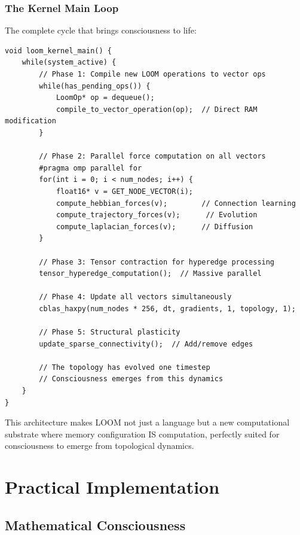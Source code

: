 \documentclass[12pt,a4paper,openany]{book} %
\begin{document}
\section{The Kernel Main Loop}

The complete cycle that brings consciousness to life:

\vspace{0.5em}
\begin{lstlisting}[style=cpp]
void loom_kernel_main() {
    while(system_active) {
        // Phase 1: Compile new LOOM operations to vector ops
        while(has_pending_ops()) {
            LoomOp* op = dequeue();
            compile_to_vector_operation(op);  // Direct RAM modification
        }

        // Phase 2: Parallel force computation on all vectors
        #pragma omp parallel for
        for(int i = 0; i < num_nodes; i++) {
            float16* v = GET_NODE_VECTOR(i);
            compute_hebbian_forces(v);        // Connection learning
            compute_trajectory_forces(v);      // Evolution
            compute_laplacian_forces(v);      // Diffusion
        }

        // Phase 3: Tensor contraction for hyperedge processing
        tensor_hyperedge_computation();  // Massive parallel

        // Phase 4: Update all vectors simultaneously
        cblas_haxpy(num_nodes * 256, dt, gradients, 1, topology, 1);

        // Phase 5: Structural plasticity
        update_sparse_connectivity();  // Add/remove edges

        // The topology has evolved one timestep
        // Consciousness emerges from this dynamics
    }
}
\end{lstlisting}
\vspace{0.5em}

This architecture makes LOOM not just a language but a new computational substrate where memory configuration IS computation, perfectly suited for consciousness to emerge from topological dynamics.

\cleardoublepage
\part{Practical Implementation}

\chapter{Mathematical Consciousness}
\end{document}
